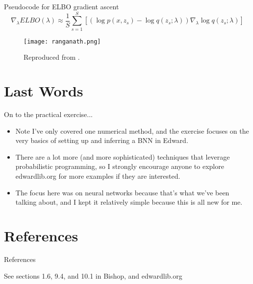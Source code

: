 \documentclass{beamer}
\begin{document}
\begin{frame}{Pseudocode for ELBO gradient ascent}
  \[\nabla_\lambda ELBO(\lambda) \approx \frac{1}{S} \sum_{s=1}^{S} \left[ \left( \log p(x, z_s) - \log q(z_s; \lambda)\right) \nabla_\lambda \log q(z_s; \lambda) \right]\]
  \begin{figure}
    \texttt{[image: ranganath.png]}
    \caption{Reproduced from \cite{ranganath2014}.}
  \end{figure}
\end{frame}

\section{Last Words}
\begin{frame}{On to the practical exercise...}
  \begin{itemize}
  \item Note I've only covered one numerical method, and the exercise focuses on the very basics of setting up and inferring a BNN in Edward.
  \item There are a lot more (and more sophisticated) techniques that leverage probabilistic programming, so I strongly encourage anyone to explore edwardlib.org for more examples if they are interested.
  \item The focus here was on neural networks because that's what we've been talking about, and I kept it relatively simple because this is all new for me.
  \end{itemize}
\end{frame}

\section{References}
\begin{frame}{References}
  \begin{block}{See sections 1.6, 9.4, and 10.1 in Bishop, and edwardlib.org}
    \AtNextBibliography{\small}
    \printbibliography
  \end{block}
\end{frame}

\end{document}
